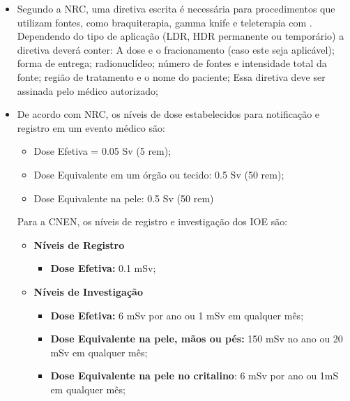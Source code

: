 \documentclass[11pt,a4paper]{article}
\newcounter{exemplo}
\begin{document}
\begin{exemplo}[11. Qualidade ]
\begin{itemize}
        \item Segundo a NRC, uma diretiva escrita é necessária para procedimentos que utilizam fontes, como braquiterapia, gamma knife e teleterapia com . Dependendo do tipo de aplicação (LDR, HDR permanente ou temporário) a diretiva deverá conter: A dose e o fracionamento (caso este seja aplicável); forma de entrega; radionuclídeo; número de fontes e intensidade total da fonte; região de tratamento e o nome do paciente; Essa diretiva deve ser assinada pelo médico autorizado;
        
        \item De acordo com NRC, os níveis de dose estabelecidos para notificação e registro em um evento médico são:
            \begin{itemize}[label=\textcolor{CarnationPink}{$\star$}]
                \item Dose Efetiva = 0.05 Sv (5 rem);
                \item Dose Equivalente em um órgão ou tecido: 0.5 Sv (50 rem);
                \item Dose Equivalente na pele: 0.5 Sv (50 rem)
            \end{itemize}

        Para a CNEN, os níveis de registro e investigação dos IOE são:
            \begin{itemize}[label=\textcolor{CarnationPink}{$\star$}]
                \item \textbf{Níveis de Registro}
                    \begin{itemize}[label=\textcolor{CarnationPink}{$\star$}]
                        \item \textbf{Dose Efetiva:} 0.1 mSv;
                    \end{itemize}

                \item \textbf{Níveis de Investigação}
                \begin{itemize}[label=\textcolor{CarnationPink}{$\star$}]
                    \item \textbf{Dose Efetiva:} 6 mSv por ano ou 1 mSv em qualquer mês;
                    \item \textbf{Dose Equivalente na pele, mãos ou pés:} 150 mSv no ano ou 20 mSv em qualquer mês;
                    \item \textbf{Dose Equivalente na pele no critalino}: 6 mSv por ano ou 1mS em qualquer mês;
                \end{itemize}
            \end{itemize}


\end{itemize}
\end{exemplo}
\end{document}
